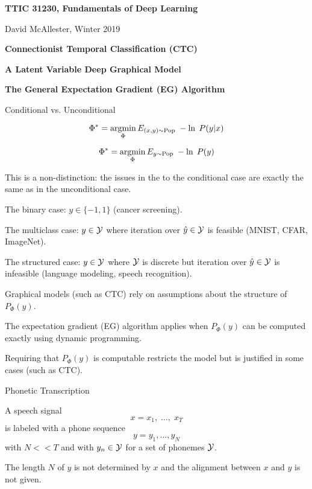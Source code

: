 





{\Huge

  \centerline{\bf TTIC 31230, Fundamentals of Deep Learning}
  \bigskip
  \centerline{David McAllester, Winter 2019}
  \vfill
  \vfill
  \centerline{\bf Connectionist Temporal Classification (CTC)}
  \vfill
  \centerline{\bf A Latent Variable Deep Graphical Model}
  \vfill
  \centerline{\bf The General Expectation Gradient (EG) Algorithm}
\vfill
{}

Conditional vs. Unconditional

\vfill
$$\Phi^* = \operatorname*{argmin}_\Phi E_{(x,y) \sim \mathrm{Pop}}\;-\ln \;P(y|x)$$

\vfill
$$\Phi^* = \operatorname*{argmin}_\Phi E_{y \sim \mathrm{Pop}}\;-\ln \;P(y)$$

\vfill
This is a non-distinction: the issues in the to the conditional case
are exactly the same as in the unconditional case.


The binary case: $y \in \{-1,1\}$ (cancer screening).

\vfill
The multiclass case: $y \in {\cal Y}$ where iteration over $\hat{y} \in {\cal Y}$ is feasible (MNIST, CFAR, ImageNet).

\vfill
{\color{red} The structured case: $y \in {\cal Y}$ where ${\cal Y}$ is discrete but iteration over $\hat{y} \in {\cal Y}$ is infeasible} (language modeling, speech recognition).


Graphical models (such as CTC) rely on assumptions about the structure of $P_\Phi(y)$.

\vfill
The {\color{red} expectation gradient (EG)} algorithm applies when $P_\Phi(y)$ can be computed exactly using dynamic programming.

\vfill
{\color{red} Requiring that $P_\Phi(y)$ is computable restricts the model but is justified in some cases (such as CTC).}

{Phonetic Transcription}

A speech signal
$$x = x_1,\; \ldots,\; x_T$$
is labeled with a phone sequence
$$y = y_1, \ldots, y_N$$
with $N << T$ and with $y_n \in {\cal Y}$ for a set of phonemes ${\cal Y}$.

\vfill
The length $N$ of $y$ is not determined by $x$ and the alignment between $x$ and $y$ is not given.

}
